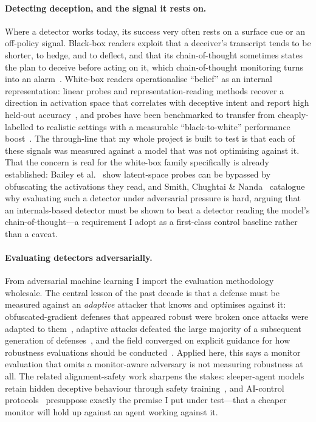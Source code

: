 \documentclass{webofc}
\begin{document}
\paragraph{Detecting deception, and the signal it rests on.} Where a detector
works today, its success very often rests on a surface cue or an off-policy
signal. Black-box readers exploit that a deceiver's transcript tends to be
shorter, to hedge, and to deflect, and that its chain-of-thought sometimes
states the plan to deceive before acting on it, which chain-of-thought
monitoring turns into an alarm~\cite{baker2025}. White-box readers operationalise
``belief'' as an internal representation: linear probes and representation-reading
methods recover a direction in activation space that correlates with deceptive
intent and report high held-out accuracy~\cite{goldowskydill2025,zou2023,burns2022},
and probes have been benchmarked to transfer from cheaply-labelled to realistic
settings with a measurable ``black-to-white'' performance
boost~\cite{parrack2025}. The through-line that my whole project is built to test
is that each of these signals was measured against a model that was not
optimising against it. That the concern is real for the white-box family
specifically is already established: Bailey et al.~\cite{bailey2024} show
latent-space probes can be bypassed by obfuscating the activations they read, and
Smith, Chughtai \& Nanda~\cite{smith2025} catalogue why evaluating such a
detector under adversarial pressure is hard, arguing that an internals-based
detector must be shown to beat a detector reading the model's chain-of-thought---a
requirement I adopt as a first-class control baseline rather than a caveat.

\paragraph{Evaluating detectors adversarially.} From adversarial machine
learning I import the evaluation methodology wholesale. The central lesson of
the past decade is that a defense must be measured against an \emph{adaptive}
attacker that knows and optimises against it: obfuscated-gradient defenses that
appeared robust were broken once attacks were adapted to
them~\cite{athalye2018}, adaptive attacks defeated the large majority of a
subsequent generation of defenses~\cite{tramer2020}, and the field converged on
explicit guidance for how robustness evaluations should be
conducted~\cite{carlini2019}. Applied here, this says a monitor evaluation that
omits a monitor-aware adversary is not measuring robustness at all. The related
alignment-safety work sharpens the stakes: sleeper-agent models retain hidden
deceptive behaviour through safety training~\cite{hubinger2024}, and AI-control
protocols~\cite{greenblatt2023} presuppose exactly the premise I put under test---that
a cheaper monitor will hold up against an agent working against it.
\end{document}
